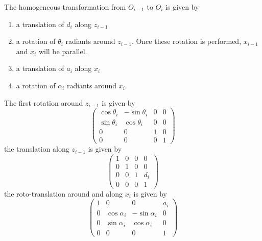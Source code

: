 \documentclass[10pt, letterpaper]{report}
\begin{document}
The homogeneous transformation from $O_{i-1}$ to $O_i$ is given by\begin{enumerate}
    \item a translation of $d_i$ along $z_{i-1}$
    \item a rotation of $\theta_i$ radiants around $z_{i-1}$. Once these rotation is performed, $x_{i-1}$ and $x_i$ will be parallel. 
    \item a translation of $a_i$ along $x_i$ 
    \item a rotation of $\alpha_i$ radiants around $x_{i}$.
\end{enumerate}
The first rotation around $z_{i-1}$ is given by\begin{equation}
    \begin{pmatrix}
        \cos\theta_i&-\sin\theta_i&0&0\\ 
        \sin\theta_i&\cos\theta_i&0&0\\ 
        0&0&1&0\\ 
        0&0&0&1
    \end{pmatrix}
\end{equation}
the translation along $z_{i-1}$ is given by \begin{equation}
    \begin{pmatrix}
        1&0&0&0\\ 
        0&1&0&0\\ 
        0&0&1&d_i\\ 
        0&0&0&1
    \end{pmatrix}
\end{equation}
the roto-translation around and along $x_i$ is given by\begin{equation}
    \begin{pmatrix}
       1&0&0&a_i\\ 
       0&\cos\alpha_i&-\sin\alpha_i&0\\ 
        0&\sin\alpha_i&\cos\alpha_i&0\\ 
        0&0&0&1
    \end{pmatrix}
\end{equation}
\end{document}
